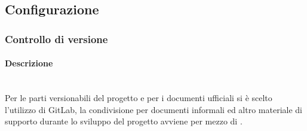 \subsection{Configurazione}
\label{sec:configurazione}
\subsubsection{Controllo di versione}
\paragraph{Descrizione}\mbox{}\\[0.4cm]
Per le parti versionabili del progetto e per i documenti ufficiali si è scelto l’utilizzo di GitLab, la condivisione per documenti informali ed altro materiale di supporto durante lo sviluppo del progetto avviene per mezzo di .
